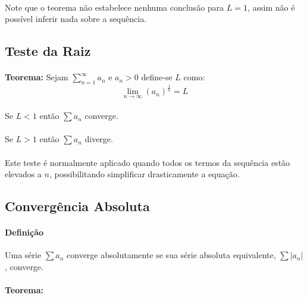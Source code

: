 \documentclass{article}
\begin{document}
            \paragraph{}Note que o teorema não estabelece nenhuma conclusão para $L=1$, assim não é possível inferir nada sobre a sequência. 
            
        \subsection{Teste da Raiz}
            \paragraph{}\textbf{Teorema:} Sejam $\sum\limits_{n=1}^{\infty}a_{n}$ e $a_{n}>0$ define-se $L$ como:
                \begin{equation}
                    \lim_{n\to\infty}{(a_{n})}^{\frac{1}{n}}=L
                \end{equation}
            \paragraph{}Se $L<1$ então $\sum a_{n}$ converge.
            \paragraph{}Se $L>1$ então $\sum a_{n}$ diverge.
            \paragraph{}Este teste é normalmente aplicado quando todos os termos da sequência estão elevados a $n$, possibilitando simplificar drasticamente a equação.

        \subsection{Convergência Absoluta}
            \paragraph{Definição}Uma série $\sum a_{n}$ converge absolutamente se sua série absoluta equivalente, $\sum |a_{n}|$, converge.
            \paragraph{}\textbf{Teorema:}
            
\end{document}
